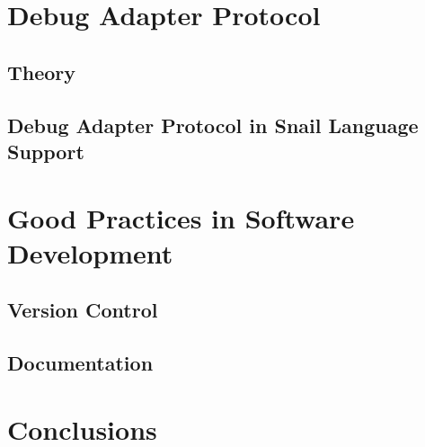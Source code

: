 \documentclass{article}
\begin{document}
\section{Debug Adapter Protocol}

\subsection{Theory}

\subsection{Debug Adapter Protocol in Snail Language Support}

\section{Good Practices in Software Development}

\subsection{Version Control}

\subsection{Documentation}

\section{Conclusions}

\newpage




\newpage
\end{document}
